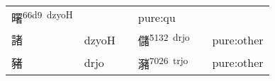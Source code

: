 \documentclass[14pt,a4paper]{scrartcl}
\begin{document}
\begin{longtable}[c]{@{}llllll@{}}
\begin{minipage}[t]{0.14\columnwidth}
曙\textsuperscript{66d9~dzyoH}
\strut\end{minipage} &
\begin{minipage}[t]{0.14\columnwidth}\raggedright\strut
\strut\end{minipage} &
\begin{minipage}[t]{0.14\columnwidth}\raggedright\strut
\strut\end{minipage} &
\begin{minipage}[t]{0.14\columnwidth}\raggedright\strut
pure:qu
\strut\end{minipage}\tabularnewline
\begin{minipage}[t]{0.14\columnwidth}\raggedright\strut
諸
\strut\end{minipage} &
\begin{minipage}[t]{0.14\columnwidth}\raggedright\strut
dzyoH
\strut\end{minipage} &
\begin{minipage}[t]{0.14\columnwidth}\raggedright\strut
\strut\end{minipage} &
\begin{minipage}[t]{0.14\columnwidth}\raggedright\strut
儲\textsuperscript{5132~drjo}
\strut\end{minipage} &
\begin{minipage}[t]{0.14\columnwidth}\raggedright\strut
\strut\end{minipage} &
\begin{minipage}[t]{0.14\columnwidth}\raggedright\strut
pure:other
\strut\end{minipage}\tabularnewline
\begin{minipage}[t]{0.14\columnwidth}\raggedright\strut
豬
\strut\end{minipage} &
\begin{minipage}[t]{0.14\columnwidth}\raggedright\strut
drjo
\strut\end{minipage} &
\begin{minipage}[t]{0.14\columnwidth}\raggedright\strut
\strut\end{minipage} &
\begin{minipage}[t]{0.14\columnwidth}\raggedright\strut
瀦\textsuperscript{7026~trjo}
\strut\end{minipage} &
\begin{minipage}[t]{0.14\columnwidth}\raggedright\strut
\strut\end{minipage} &
\begin{minipage}[t]{0.14\columnwidth}\raggedright\strut
pure:other
\strut\end{minipage}\tabularnewline

\end{longtable}
\end{document}
